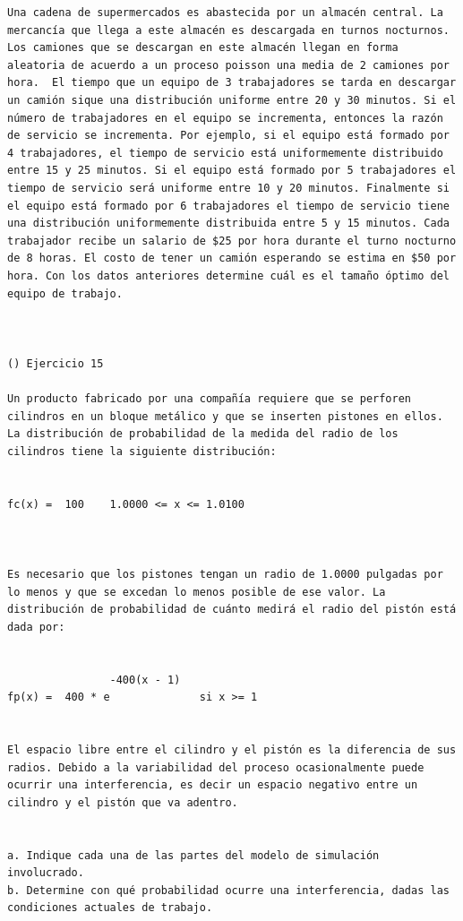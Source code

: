 \begin{verbatim}
Una cadena de supermercados es abastecida por un almacén central. La mercancía que llega a este almacén es descargada en turnos nocturnos. Los camiones que se descargan en este almacén llegan en forma aleatoria de acuerdo a un proceso poisson una media de 2 camiones por hora.  El tiempo que un equipo de 3 trabajadores se tarda en descargar un camión sique una distribución uniforme entre 20 y 30 minutos. Si el número de trabajadores en el equipo se incrementa, entonces la razón de servicio se incrementa. Por ejemplo, si el equipo está formado por 4 trabajadores, el tiempo de servicio está uniformemente distribuido entre 15 y 25 minutos. Si el equipo está formado por 5 trabajadores el tiempo de servicio será uniforme entre 10 y 20 minutos. Finalmente si el equipo está formado por 6 trabajadores el tiempo de servicio tiene una distribución uniformemente distribuida entre 5 y 15 minutos. Cada trabajador recibe un salario de $25 por hora durante el turno nocturno de 8 horas. El costo de tener un camión esperando se estima en $50 por hora. Con los datos anteriores determine cuál es el tamaño óptimo del equipo de trabajo.



() Ejercicio 15

Un producto fabricado por una compañía requiere que se perforen cilindros en un bloque metálico y que se inserten pistones en ellos. 
La distribución de probabilidad de la medida del radio de los cilindros tiene la siguiente distribución:


fc(x) =  100    1.0000 <= x <= 1.0100
 


Es necesario que los pistones tengan un radio de 1.0000 pulgadas por lo menos y que se excedan lo menos posible de ese valor. La distribución de probabilidad de cuánto medirá el radio del pistón está dada por:


                -400(x - 1)
fp(x) =  400 * e              si x >= 1


El espacio libre entre el cilindro y el pistón es la diferencia de sus radios. Debido a la variabilidad del proceso ocasionalmente puede ocurrir una interferencia, es decir un espacio negativo entre un cilindro y el pistón que va adentro. 


a. Indique cada una de las partes del modelo de simulación involucrado.
b. Determine con qué probabilidad ocurre una interferencia, dadas las condiciones actuales de trabajo.


\end{verbatim}
 